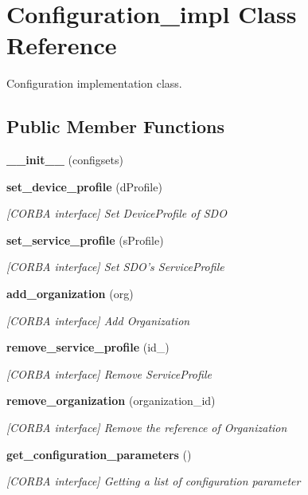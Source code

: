 \section{Configuration\_\-impl Class Reference}
\label{classConfiguration__impl}
Configuration implementation class.  


\subsection*{Public Member Functions}
\begin{CompactItemize}
\item 
{\bf \_\-\_\-init\_\-\_\-} (configsets)
\item 
{\bf set\_\-device\_\-profile} (d\-Profile)
\begin{CompactList}\small\item\em [CORBA interface] Set Device\-Profile of SDO \item\end{CompactList}\item 
{\bf set\_\-service\_\-profile} (s\-Profile)
\begin{CompactList}\small\item\em [CORBA interface] Set SDO's Service\-Profile \item\end{CompactList}\item 
{\bf add\_\-organization} (org)
\begin{CompactList}\small\item\em [CORBA interface] Add Organization \item\end{CompactList}\item 
{\bf remove\_\-service\_\-profile} (id\_\-)
\begin{CompactList}\small\item\em [CORBA interface] Remove Service\-Profile \item\end{CompactList}\item 
{\bf remove\_\-organization} (organization\_\-id)
\begin{CompactList}\small\item\em [CORBA interface] Remove the reference of Organization \item\end{CompactList}\item 
{\bf get\_\-configuration\_\-parameters} ()
\begin{CompactList}\small\item\em [CORBA interface] Getting a list of configuration parameter \item\end{CompactList}\item 

\end{CompactItemize}
